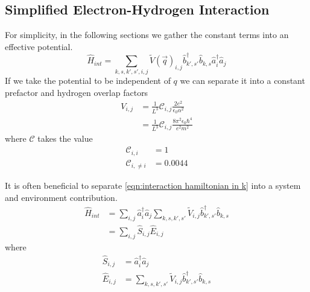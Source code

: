 \subsection{Simplified Electron-Hydrogen Interaction}
For simplicity, in the following sections
we gather the constant terms into
an effective potential.
\begin{equation}
  \hat{H}_{int} = \sum_{k,s,k',s',i,j}
  {\tilde{V}(\vec{q})}_{i,j}
  \hat{b}^\dagger_{k',s'}\hat{b}_{k,s}
  \hat{a}^\dagger_{i}\hat{a}_{j}
  \label{eqn:interaction hamiltonian in k}
\end{equation}
If we take the potential to be independent
of \(q\) we can separate it
into a constant prefactor
and hydrogen overlap factors
\begin{align}
  V_{i,j}
   & =
  \frac{1}{L^3}
  \mathcal{C}_{i,j}
  \frac{2e^2}{\epsilon_0 \alpha^2} \\
   & =
  \frac{1}{L^3}
  \mathcal{C}_{i,j}
  \frac{8 \pi^2 \epsilon_0 \hbar^4}{e^2 m^2}
  \label{eqn:simplified interacton potential}
\end{align}
where \(\mathcal{C}\) takes
the value
\begin{align}
  \mathcal{C}_{i, i}      & = 1      \\
  \mathcal{C}_{i, \neq i} & = 0.0044
\end{align}

It is often beneficial to separate
\cref{eqn:interaction hamiltonian in k}
into a system and environment contribution.
\begin{align}
  \hat{H}_{int} & =
  \sum_{i,j}
  \hat{a}^\dagger_{i}\hat{a}_{j}
  \sum_{k,s,k',s'}
  \tilde{V}_{i,j}
  \hat{b}^\dagger_{k',s'}\hat{b}_{k,s} \\
                & = \sum_{i,j}
  \hat{S}_{i,j} \hat{E}_{i,j}\label{eqn:split interaction hamiltonian}
\end{align}
where
\begin{align}
  \hat{S}_{i,j} & = \hat{a}^\dagger_{i}\hat{a}_{j} \\
  \hat{E}_{i,j} & = \sum_{k,s,k',s'}
  \tilde{V}_{i,j}
  \hat{b}^\dagger_{k',s'}\hat{b}_{k,s}
\end{align}